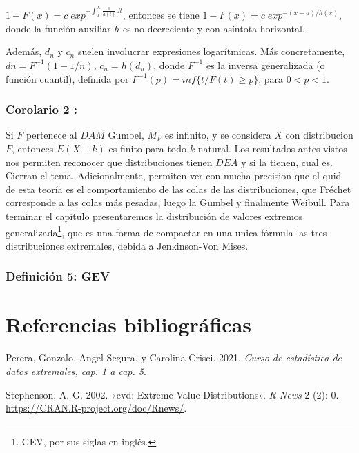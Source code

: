 \documentclass[
  12pt]{article}
\newlength{\cslhangindent}
\newlength{\cslentryspacingunit} %
\newenvironment{CSLReferences}[2] %
 {%
  \setlength{\parindent}{0pt}
  \ifodd #1
  \let\oldpar\par
  \def\par{\hangindent=\cslhangindent\oldpar}
  \fi
  \setlength{\parskip}{#2\cslentryspacingunit}
 }%
 {}
\begin{document}
\(1-F(x)= c\;exp^{{- \int_a^X \frac{1}{h(t)} dt}}\), entonces se tiene
\(1-F(x)= c\;exp^{-(x-a)/h(x)}\), donde la función auxiliar \(h\) es
no-decreciente y con asíntota horizontal.

Además, \(d_n\) y \(c_n\) suelen involucrar expresiones logarítmicas.
Más concretamente, \(dn = F^{-1}(1-1/n)\), \(c_n = h(d_n)\), donde
\(F^{-1}\) es la inversa generalizada (o función cuantil), definida por
\(F^{-1}(p)= inf\{t / F(t)\geq p\}\), para \(0<p<1\).

\hypertarget{corolario-2}{%
\subsubsection{Corolario 2 :}\label{corolario-2}}

Si \(F\) pertenece al \(DAM\) Gumbel, \(M_F\) es infinito, y se
considera \(X\) con distribucion \(F\), entonces \(E(X+k)\) es finito
para todo \(k\) natural. Los resultados antes vistos nos permiten
reconocer que distribuciones tienen \(DEA\) y si la tienen, cual es.
Cierran el tema. Adicionalmente, permiten ver con mucha precision que el
quid de esta teoría es el comportamiento de las colas de las
distribuciones, que Fréchet corresponde a las colas más pesadas, luego
la Gumbel y finalmente Weibull. Para terminar el capítulo presentaremos
la distribución de valores extremos
generalizada\footnote{GEV, por sus siglas en inglés.}, que es una forma
de compactar en una unica fórmula las tres distribuciones extremales,
debida a Jenkinson-Von Mises.

\hypertarget{definiciuxf3n-5-gev}{%
\subsubsection{Definición 5: GEV}\label{definiciuxf3n-5-gev}}

\newpage

\hypertarget{referencias-bibliogruxe1ficas}{%
\section{Referencias
bibliográficas}\label{referencias-bibliogruxe1ficas}}

\vspace{1cm}
\setlength{\parindent}{-0.2in}
\setlength{\leftskip}{0.2in}

\hypertarget{refs}{}
\begin{CSLReferences}{1}{0}
\leavevmode{}%
Perera, Gonzalo, Angel Segura, y Carolina Crisci. 2021. \emph{Curso de
estadística de datos extremales, cap. 1 a cap. 5}.

\leavevmode{}%
Stephenson, A. G. 2002. {«evd: Extreme Value Distributions»}. \emph{R
News} 2 (2): 0. \url{https://CRAN.R-project.org/doc/Rnews/}.

\end{CSLReferences}
\end{document}
